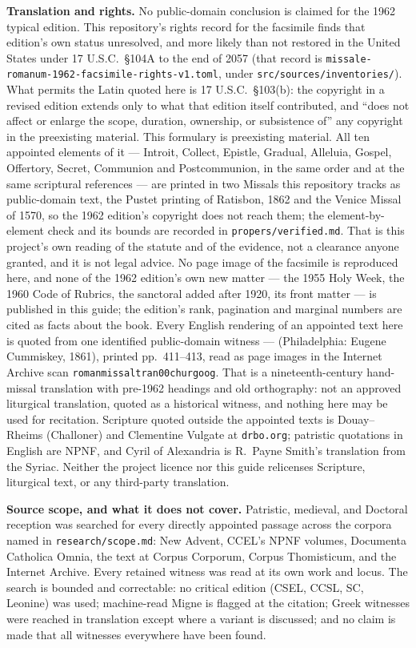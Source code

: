 \textbf{Translation and rights.} No public-domain conclusion is claimed for the
1962 typical edition. This repository's rights record for the facsimile finds
that edition's own status unresolved, and more likely than not restored in the
United States under 17 U.S.C.\ \S104A to the end of 2057 (that record is
\texttt{missale-romanum-1962-facsimile-rights-v1.toml}, under
\texttt{src/sources/inventories/}).
What permits the Latin quoted here is 17 U.S.C.\ \S103(b): the copyright in a
revised edition extends only to what that edition itself contributed, and ``does
not affect or enlarge the scope, duration, ownership, or subsistence of'' any
copyright in the preexisting material. This formulary is preexisting material.
All ten appointed elements of it --- Introit, Collect, Epistle, Gradual,
Alleluia, Gospel, Offertory, Secret, Communion and Postcommunion, in the same
order and at the same scriptural references --- are printed in two Missals this
repository tracks as public-domain text, the Pustet printing of Ratisbon, 1862
and the Venice Missal of 1570, so the 1962 edition's copyright does not reach
them; the element-by-element check and its bounds are recorded in
\texttt{propers/verified.md}. That is this project's own reading of the statute and of the evidence,
not a clearance anyone granted, and it is not legal advice. No page image of the
facsimile is reproduced here, and none of the 1962 edition's own new matter ---
the 1955 Holy Week, the 1960 Code of Rubrics, the sanctoral added after 1920, its
front matter --- is published in this guide; the edition's rank, pagination and
marginal numbers are cited as facts about the book. Every English rendering of an
appointed text here is quoted from one identified public-domain witness --- 
(Philadelphia: Eugene Cummiskey, 1861), printed pp.\ 411--413, read as page
images in the Internet Archive scan \texttt{romanmissaltran00churgoog}. That is a
nineteenth-century hand-missal translation with pre-1962 headings and old
orthography: not an approved liturgical translation, quoted as a historical
witness, and nothing here may be used for recitation. Scripture quoted outside
the appointed texts is Douay--Rheims (Challoner) and Clementine Vulgate at
\texttt{drbo.org}; patristic quotations in English are NPNF, and Cyril of
Alexandria is R.~Payne Smith's translation from the Syriac. Neither the project
licence nor this guide relicenses Scripture, liturgical text, or any third-party
translation.

\textbf{Source scope, and what it does not cover.} Patristic, medieval, and
Doctoral reception was searched for every directly appointed passage across the
corpora named in \texttt{research/scope.md}: New Advent, CCEL's NPNF volumes,
Documenta Catholica Omnia, the  text at Corpus Corporum,
Corpus Thomisticum, and the Internet Archive. Every retained witness was read at
its own work and locus. The search is bounded and correctable: no critical
edition (CSEL, CCSL, SC, Leonine) was used; machine-read Migne is flagged at the
citation; Greek witnesses were reached in translation except where a variant is
discussed; and no claim is made that all witnesses everywhere have been found.

